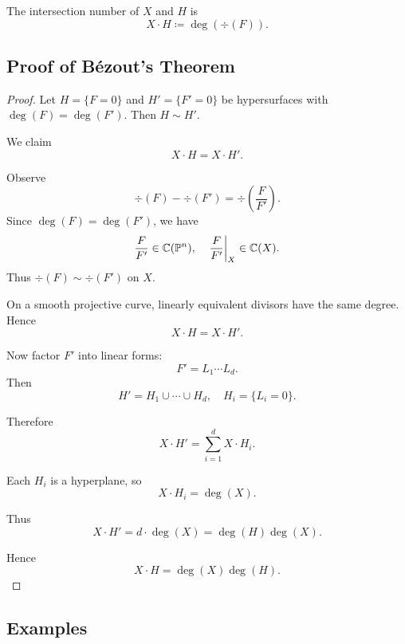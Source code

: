 \begin{definition}
    The intersection number of $X$ and $H$ is
    \[
        X \cdot H \coloneqq \deg(\div(F)).
    \]
\end{definition}

\subsection*{Proof of Bézout's Theorem}

\begin{proof}
    Let $H = \{F = 0\}$ and $H' = \{F' = 0\}$ be hypersurfaces with $\deg(F) = \deg(F')$.
    Then $H \sim H'$.

    We claim
    \[
        X \cdot H = X \cdot H'.
    \]

    Observe
    \[
        \div(F) - \div(F') = \div\!\left(\frac{F}{F'}\right).
    \]
    Since $\deg(F) = \deg(F')$, we have
    \[
        \dfrac{F}{F'} \in \mathbb{C}(\mathbb{P}^n),
        \quad
        \left.\dfrac{F}{F'}\right|_X \in \mathbb{C}(X).
    \]
    Thus $\div(F) \sim \div(F')$ on $X$.

    On a smooth projective curve, linearly equivalent divisors have the same degree.
    Hence
    \[
        X \cdot H = X \cdot H'.
    \]

    Now factor $F'$ into linear forms:
    \[
        F' = L_1 \cdots L_d.
    \]
    Then
    \[
        H' = H_1 \cup \cdots \cup H_d,
        \quad
        H_i = \{L_i = 0\}.
    \]

    Therefore
    \[
        X \cdot H'
        = \sum_{i=1}^{d} X \cdot H_i.
    \]

    Each $H_i$ is a hyperplane, so
    \[
        X \cdot H_i = \deg(X).
    \]

    Thus
    \[
        X \cdot H' = d \cdot \deg(X) = \deg(H)\deg(X).
    \]

    Hence
    \[
        X \cdot H = \deg(X)\deg(H).
    \]
\end{proof}

\subsection*{Examples}

